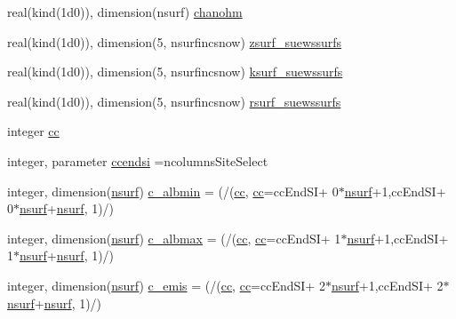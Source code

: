 \begin{DoxyCompactItemize}
\item 
real(kind(1d0)), dimension(nsurf) \hyperlink{namespaceallocatearray_a10d39115371a0bd3c9a9fc9d4bc7fb2f}{chanohm}
\item 
real(kind(1d0)), dimension(5, nsurfincsnow) \hyperlink{namespaceallocatearray_a082c4e8a9d0c63a3a4cef12491a00e0f}{zsurf\+\_\+suewssurfs}
\item 
real(kind(1d0)), dimension(5, nsurfincsnow) \hyperlink{namespaceallocatearray_ab18052a7670fb2dcb20cee408efee503}{ksurf\+\_\+suewssurfs}
\item 
real(kind(1d0)), dimension(5, nsurfincsnow) \hyperlink{namespaceallocatearray_a9e55bcf0c5382bbe3fc4267c8f6869f3}{rsurf\+\_\+suewssurfs}
\item 
integer \hyperlink{namespaceallocatearray_ac863c81704eb507dee10f5e10741e10c}{cc}
\item 
integer, parameter \hyperlink{namespaceallocatearray_a5f0294ee2fa3b1d82be15cd51d1673f9}{ccendsi} =ncolumns\+Site\+Select
\item 
integer, dimension(\hyperlink{namespaceallocatearray_acd22f92a06f7e9a2a91426b3dc99fdb0}{nsurf}) \hyperlink{namespaceallocatearray_a91ee5bc5a0b80fc80743025448cf3317}{c\+\_\+albmin} = (/(\hyperlink{namespaceallocatearray_ac863c81704eb507dee10f5e10741e10c}{cc}, \hyperlink{namespaceallocatearray_ac863c81704eb507dee10f5e10741e10c}{cc}=cc\+End\+SI+ 0$\ast$\hyperlink{namespaceallocatearray_acd22f92a06f7e9a2a91426b3dc99fdb0}{nsurf}+1,cc\+End\+SI+ 0$\ast$\hyperlink{namespaceallocatearray_acd22f92a06f7e9a2a91426b3dc99fdb0}{nsurf}+\hyperlink{namespaceallocatearray_acd22f92a06f7e9a2a91426b3dc99fdb0}{nsurf}, 1)/)
\item 
integer, dimension(\hyperlink{namespaceallocatearray_acd22f92a06f7e9a2a91426b3dc99fdb0}{nsurf}) \hyperlink{namespaceallocatearray_af832f9ed003852e1fcd849c6de9196fd}{c\+\_\+albmax} = (/(\hyperlink{namespaceallocatearray_ac863c81704eb507dee10f5e10741e10c}{cc}, \hyperlink{namespaceallocatearray_ac863c81704eb507dee10f5e10741e10c}{cc}=cc\+End\+SI+ 1$\ast$\hyperlink{namespaceallocatearray_acd22f92a06f7e9a2a91426b3dc99fdb0}{nsurf}+1,cc\+End\+SI+ 1$\ast$\hyperlink{namespaceallocatearray_acd22f92a06f7e9a2a91426b3dc99fdb0}{nsurf}+\hyperlink{namespaceallocatearray_acd22f92a06f7e9a2a91426b3dc99fdb0}{nsurf}, 1)/)
\item 
integer, dimension(\hyperlink{namespaceallocatearray_acd22f92a06f7e9a2a91426b3dc99fdb0}{nsurf}) \hyperlink{namespaceallocatearray_aaf59aa57c3692da64fc1105b477d5f05}{c\+\_\+emis} = (/(\hyperlink{namespaceallocatearray_ac863c81704eb507dee10f5e10741e10c}{cc}, \hyperlink{namespaceallocatearray_ac863c81704eb507dee10f5e10741e10c}{cc}=cc\+End\+SI+ 2$\ast$\hyperlink{namespaceallocatearray_acd22f92a06f7e9a2a91426b3dc99fdb0}{nsurf}+1,cc\+End\+SI+ 2$\ast$\hyperlink{namespaceallocatearray_acd22f92a06f7e9a2a91426b3dc99fdb0}{nsurf}+\hyperlink{namespaceallocatearray_acd22f92a06f7e9a2a91426b3dc99fdb0}{nsurf}, 1)/)

\end{DoxyCompactItemize}
